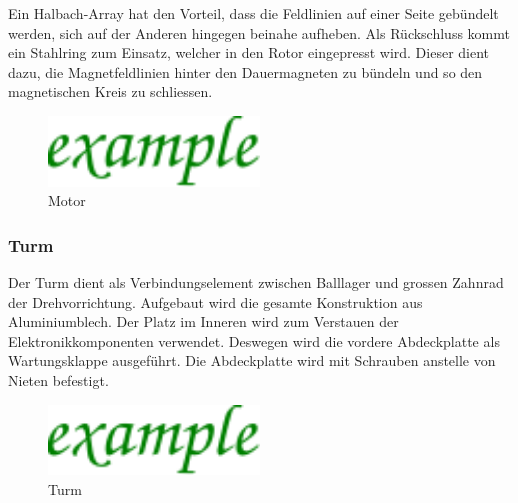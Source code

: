 \noindent
Ein Halbach-Array hat den Vorteil, dass die Feldlinien auf einer 
Seite gebündelt werden, sich auf der Anderen hingegen beinahe aufheben. 
Als Rückschluss kommt ein Stahlring zum Einsatz, welcher in den Rotor 
eingepresst wird. Dieser dient dazu, die Magnetfeldlinien hinter den 
Dauermagneten zu bündeln und so den magnetischen Kreis zu schliessen. 

\begin{figure}[h!]
    \centering
    \includegraphics[width=0.5\textwidth]{../example/fig/example.pdf}
    \caption{Motor}
    \label{fig:motor}
\end{figure}

\subsubsection{Turm}
Der Turm dient als Verbindungselement zwischen Balllager und grossen Zahnrad 
der Drehvorrichtung. Aufgebaut wird die gesamte Konstruktion aus 
Aluminiumblech. Der Platz im Inneren wird zum Verstauen der 
Elektronikkomponenten verwendet. Deswegen wird die vordere Abdeckplatte als 
Wartungsklappe ausgeführt. Die Abdeckplatte wird mit Schrauben anstelle von 
Nieten befestigt.

\begin{figure}[h!]
    \centering
    \includegraphics[width=0.5\textwidth]{../example/fig/example.pdf}
    \caption{Turm}
    \label{fig:turm}
\end{figure}
